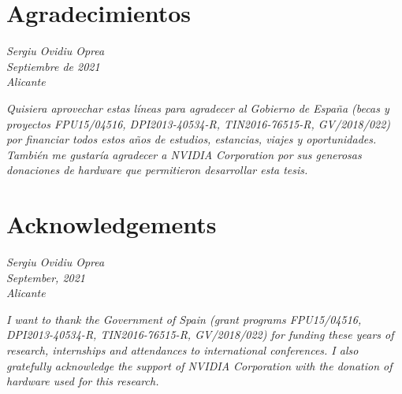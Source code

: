 \chapter{Agradecimientos}


\noindent\emph{Sergiu Ovidiu Oprea}\\
\emph{Septiembre de 2021}\\
\emph{Alicante}\\

\vfill

\emph{Quisiera aprovechar estas líneas para agradecer al Gobierno de España (becas y proyectos FPU15/04516, DPI2013-40534-R, TIN2016-76515-R, GV/2018/022) por financiar todos estos años de estudios, estancias, viajes y oportunidades. También me gustaría agradecer a NVIDIA Corporation por sus generosas donaciones de hardware que permitieron desarrollar esta tesis.}\\

\chapter{Acknowledgements}


\noindent\emph{Sergiu Ovidiu Oprea}\\
\emph{September, 2021}\\
\emph{Alicante}\\

\vfill

\emph{I want to thank the Government of Spain (grant programs FPU15/04516, DPI2013-40534-R, TIN2016-76515-R, GV/2018/022) for funding these years of research, internships and attendances to international conferences. I also gratefully acknowledge the support of NVIDIA Corporation with the donation of hardware used for this research.}\\



